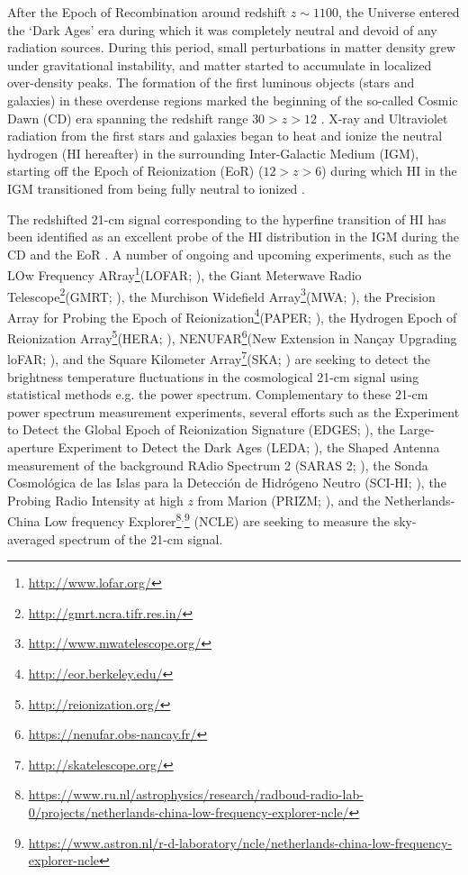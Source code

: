 \documentclass[fleqn,usenatbib]{mnras}
\begin{document}
After the Epoch of Recombination around redshift $z\sim 1100$, the Universe entered the `Dark Ages' era during which it was completely neutral and devoid of any radiation sources. During this period, small perturbations in matter density grew under gravitational instability, and matter started to accumulate in localized over-density peaks. The formation of the first luminous objects (stars and galaxies) in these overdense regions marked the beginning of the so-called Cosmic Dawn (CD) era spanning the redshift range $30 > z > 12$ \citep{pritchard2007}. X-ray and Ultraviolet radiation from the first stars and galaxies began to heat and ionize the neutral hydrogen (HI hereafter) in the surrounding Inter-Galactic Medium (IGM), starting off the Epoch of Reionization (EoR) ($12 > z > 6$) during which HI in the IGM transitioned from being fully neutral to ionized \citep{madau1997}. 

The redshifted 21-cm signal corresponding to the hyperfine transition of HI has been identified as an excellent probe of the HI distribution in the IGM during the CD and the EoR \citep{madau1997,shaver1999,furlanetto2006,pritchard2012,zaroubi2013}. A number of ongoing and upcoming experiments, such as the LOw Frequency ARray\footnote{\url{http://www.lofar.org/}}(LOFAR; \citealt{vanhaarlem2013}), the Giant Meterwave Radio Telescope\footnote{\url{http://gmrt.ncra.tifr.res.in/}}(GMRT; \citealt{paciga2011}), the Murchison Widefield Array\footnote{\url{http://www.mwatelescope.org/}}(MWA; \citealt{tingay2013,bowman2013}), the Precision Array for Probing the Epoch of Reionization\footnote{\url{http://eor.berkeley.edu/}}(PAPER; \citealt{parsons2010}), the Hydrogen Epoch of Reionization Array\footnote{\url{http://reionization.org/}}(HERA; \citealt{deboer2017}), NENUFAR\footnote{\url{https://nenufar.obs-nancay.fr/}}(New Extension in Nan\c cay Upgrading loFAR; \citealt{zarka2012}), and the Square Kilometer Array\footnote{\url{http://skatelescope.org/}}(SKA; \citealt{mellema2013,koopmans2015}) are seeking to detect the brightness temperature fluctuations in the cosmological 21-cm signal using statistical methods e.g. the power spectrum. Complementary to these 21-cm power spectrum measurement experiments, several efforts such as the Experiment to Detect the Global Epoch of Reionization Signature (EDGES; \citealt{bowman2018}), the Large-aperture Experiment to Detect the Dark Ages (LEDA; \citealt{bernardi2016}), the Shaped Antenna measurement of the background RAdio Spectrum 2 (SARAS 2; \citealt{singh2017}), the Sonda Cosmol\'{o}gica de las Islas
para la Detecci\'{o}n de Hidr\'{o}geno Neutro (SCI-HI; \citealt{voytek2014}), the Probing Radio Intensity at high $z$ from Marion (PRIZM; \citealt{philip2018}), and the Netherlands-China Low frequency Explorer\footnote{\url{https://www.ru.nl/astrophysics/research/radboud-radio-lab-0/projects/netherlands-china-low-frequency-explorer-ncle/}}$^,$\footnote{\url{https://www.astron.nl/r-d-laboratory/ncle/netherlands-china-low-frequency-explorer-ncle}} (NCLE) are seeking to measure the sky-averaged spectrum of the 21-cm signal. 
\end{document}
